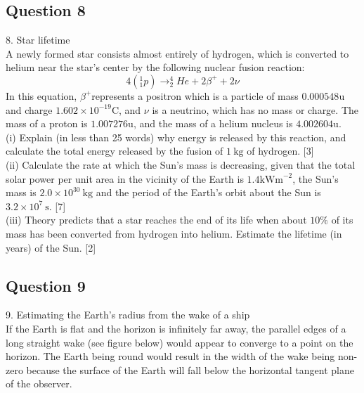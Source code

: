 \documentclass{article}
\begin{document}
\subsection{Question 8}
8. Star lifetime \\
A newly formed star consists almost entirely of hydrogen, which is converted to helium near the star's center by the following nuclear fusion reaction:
$$
4\left({ }_{1}^{1} p\right) \rightarrow_{2}^{4} H e+2 \beta^{+}+2 \nu
$$
In this equation, $\beta^{+}$represents a positron which is a particle of mass $0.000548 \mathrm{u}$ and charge $1.602 \times 10^{-19} \mathrm{C}$, and $\nu$ is a neutrino, which has no mass or charge. The mass of a proton is $1.007276 \mathrm{u}$, and the mass of a helium nucleus is $4.002604 \mathrm{u}$. \\
(i) Explain (in less than 25 words) why energy is released by this reaction, and calculate the total energy released by the fusion of $1 \mathrm{~kg}$ of hydrogen. [3] \\
(ii) Calculate the rate at which the Sun's mass is decreasing, given that the total solar power per unit area in the vicinity of the Earth is $1.4 \mathrm{kWm}^{-2}$, the Sun's mass is $2.0 \times 10^{30} \mathrm{~kg}$ and the period of the Earth's orbit about the Sun is $3.2 \times 10^{7} \mathrm{~s}$. [7] \\
(iii) Theory predicts that a star reaches the end of its life when about $10 \%$ of its mass has been converted from hydrogen into helium. Estimate the lifetime (in years) of the Sun. [2]

\subsection{Question 9}
9. Estimating the Earth's radius from the wake of a ship \\
If the Earth is flat and the horizon is infinitely far away, the parallel edges of a long straight wake (see figure below) would appear to converge to a point on the horizon. The Earth being round would result in the width of the wake being non-zero because the surface of the Earth will fall below the horizontal tangent plane of the observer.
\end{document}
